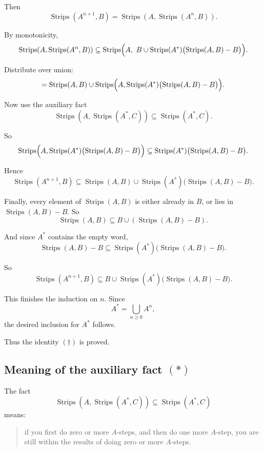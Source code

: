\documentclass[11pt]{article}
\begin{document}
Then
\[
\operatorname{Strips}(A^{n+1},B)
=
\operatorname{Strips}(A,\operatorname{Strips}(A^n,B)).
\]

By monotonicity,
\[
\operatorname{Strips}(A,\operatorname{Strips}(A^n,B))
\subseteq
\operatorname{Strips}\Bigl(A,\ B \cup \operatorname{Strips}(A^*)\bigl(\operatorname{Strips}(A,B)-B\bigr)\Bigr).
\]

Distribute over union:
\[
=
\operatorname{Strips}(A,B)
\cup
\operatorname{Strips}\Bigl(A,\operatorname{Strips}(A^*)\bigl(\operatorname{Strips}(A,B)-B\bigr)\Bigr).
\]

Now use the auxiliary fact
\[
\operatorname{Strips}(A,\operatorname{Strips}(A^*,C))
\subseteq
\operatorname{Strips}(A^*,C).
\tag{$*$}
\]

So
\[
\operatorname{Strips}\Bigl(A,\operatorname{Strips}(A^*)\bigl(\operatorname{Strips}(A,B)-B\bigr)\Bigr)
\subseteq
\operatorname{Strips}(A^*)\bigl(\operatorname{Strips}(A,B)-B\bigr).
\]

Hence
\[
\operatorname{Strips}(A^{n+1},B)
\subseteq
\operatorname{Strips}(A,B)
\cup
\operatorname{Strips}(A^*)\bigl(\operatorname{Strips}(A,B)-B\bigr).
\]

Finally, every element of \(\operatorname{Strips}(A,B)\) is either already in \(B\), or lies in \(\operatorname{Strips}(A,B)-B\). So
\[
\operatorname{Strips}(A,B)
\subseteq
B \cup (\operatorname{Strips}(A,B)-B).
\]

And since \(A^*\) contains the empty word,
\[
\operatorname{Strips}(A,B)-B
\subseteq
\operatorname{Strips}(A^*)\bigl(\operatorname{Strips}(A,B)-B\bigr).
\]

So
\[
\operatorname{Strips}(A^{n+1},B)
\subseteq
B \cup \operatorname{Strips}(A^*)\bigl(\operatorname{Strips}(A,B)-B\bigr).
\]

This finishes the induction on \(n\). Since
\[
A^*=\bigcup_{n\ge 0} A^n,
\]
the desired inclusion for \(A^*\) follows.

Thus the identity \((\dagger)\) is proved.

\subsection*{Meaning of the auxiliary fact \((*)\)}

The fact
\[
\operatorname{Strips}(A,\operatorname{Strips}(A^*,C))
\subseteq
\operatorname{Strips}(A^*,C)
\]
means:

\begin{quote}
if you first do zero or more \(A\)-steps, and then do one more \(A\)-step, you are still within the results of doing zero or more \(A\)-steps.
\end{quote}
\end{document}
